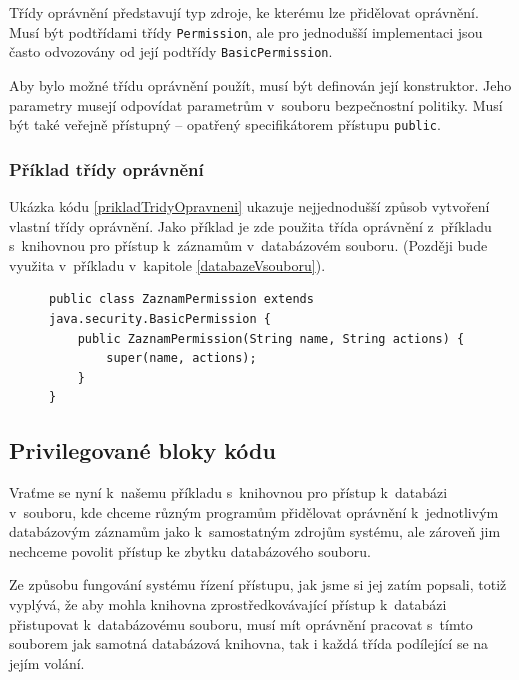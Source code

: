 Třídy oprávnění představují typ zdroje, ke kterému lze přidělovat oprávnění. Musí být podtřídami třídy {\tt Permission}, ale pro jednodušší implementaci jsou často odvozovány od její podtřídy {\tt BasicPermission}.

Aby bylo možné třídu oprávnění použít, musí být definován její konstruktor. Jeho parametry musejí odpovídat parametrům v~souboru bezpečnostní politiky. Musí být také veřejně přístupný -- opatřený specifikátorem přístupu {\tt public}.

\subsubsection{Příklad třídy oprávnění} \label{zaznamPerm}

Ukázka kódu \ref{prikladTridyOpravneni} ukazuje nejjednodušší způsob vytvoření vlastní třídy oprávnění. Jako příklad je zde použita třída oprávnění z~příkladu s~knihovnou pro přístup k~záznamům v~databázovém souboru. (Později bude využita v~příkladu v~kapitole \ref{databazeVsouboru}).

\begin{figure}[tbh]
\begin{lstlisting}[caption=Demonstrační třída oprávnění, label=prikladTridyOpravneni]
public class ZaznamPermission extends java.security.BasicPermission {
    public ZaznamPermission(String name, String actions) {
        super(name, actions);
    }
}
\end{lstlisting}
\end{figure}

\subsection{Privilegované bloky kódu}\label{privilegovaneBloky}

Vraťme se nyní k~našemu příkladu s~knihovnou pro přístup k~databázi v~souboru, kde chceme různým programům přidělovat oprávnění k~jednotlivým databázovým záznamům jako k~samostatným zdrojům systému, ale zároveň jim nechceme povolit přístup ke zbytku databázového souboru.

Ze způsobu fungování systému řízení přístupu, jak jsme si jej zatím popsali, totiž vyplývá, že aby mohla knihovna zprostředkovávající přístup k~databázi přistupovat k~databázovému souboru, musí mít oprávnění pracovat s~tímto souborem jak samotná databázová knihovna, tak i každá třída podílející se na jejím volání.

